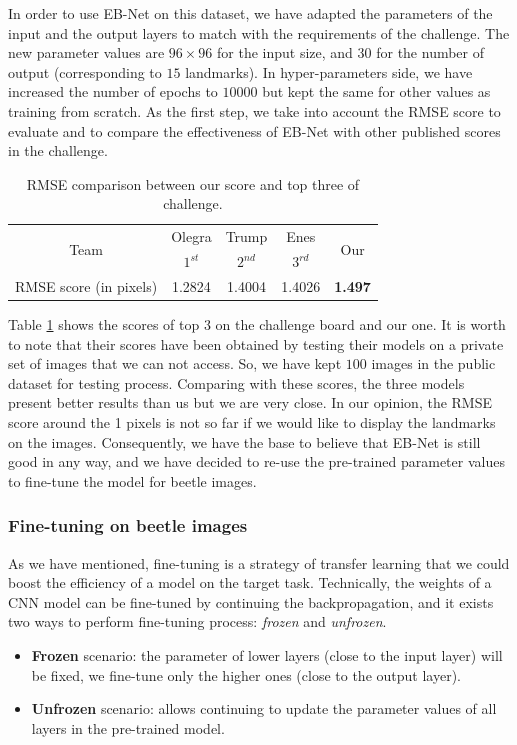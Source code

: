 \documentclass[review]{elsarticle}
\begin{document}
In order to use EB-Net on this dataset, we have adapted the parameters of the input and the output layers to match with the requirements of the challenge. The new parameter values are $96 \times 96$ for the input size, and $30$ for the number of output (corresponding to $15$ landmarks). In hyper-parameters side, we have increased the number of epochs to $10000$ but kept the same for other values as training from scratch. As the first step, we take into account the RMSE score to evaluate and to compare the effectiveness of EB-Net with other published scores in the challenge.

\begin{table}[h!]
	\centering
	\begin{tabular}{ | c | c | c | c | c |}
	\hline
	\multirow{2}{*}{Team} & Olegra & Trump & Enes & \multirow{2}{*}{Our} \\
	  & $1^{st}$ & $2^{nd}$ & $3^{rd}$ &  \\ \hline
	RMSE score (in pixels) & 1.2824 & 1.4004 & 1.4026 & \textbf{1.497} \\ \hline
\end{tabular}	
	\caption{RMSE comparison between our score and top three of challenge.}
	\label{tblRMSE_challenge}
\end{table}

Table \ref{tblRMSE_challenge} shows the scores of top $3$ on the challenge board and our one. It is worth to note that their scores have been obtained by testing their models on a private set of images that we can not access. So, we have kept $100$ images in the public dataset for testing process. Comparing with these scores, the three models present better results than us but we are very close. In our opinion, the RMSE score around the 1 pixels is not so far if we would like to display the landmarks on the images. Consequently, we have the base to believe that EB-Net is still good in any way, and we have decided to re-use the pre-trained parameter values to fine-tune the model for beetle images. 

\subsubsection{Fine-tuning on beetle images}
As we have mentioned, fine-tuning is a strategy of transfer learning that we could boost the efficiency of a model on the target task. Technically, the weights of a CNN model can be fine-tuned by continuing the backpropagation, and it exists two ways to perform fine-tuning process: \textit{frozen} and \textit{unfrozen}.
\begin{itemize}
	\item \textbf{Frozen} scenario: the parameter of lower layers (close to the input layer) will be fixed, we fine-tune only the higher ones (close to the output layer).
	\item \textbf{Unfrozen} scenario: allows continuing to update the parameter values of all layers in the pre-trained model.
\end{itemize}
\end{document}
